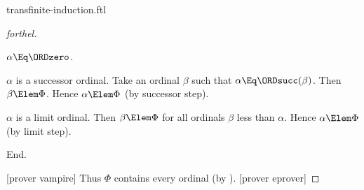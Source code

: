 \documentclass{stex}
\begin{document}
\begin{smodule}{transfinite-induction.ftl}
\begin{proof}[forthel]
    \begin{case}{$\alpha \Eq \ORDzero$.} \end{case}

    \begin{case}{$\alpha$ is a successor ordinal.}
      Take an ordinal $\beta$ such that $\alpha \Eq \ORDsucc(\beta)$.
      Then $\beta \Elem \Phi$.
      Hence $\alpha \Elem \Phi$ (by successor step).
    \end{case}

    \begin{case}{$\alpha$ is a limit ordinal.}
      Then $\beta \Elem \Phi$ for all ordinals $\beta$ less than $\alpha$.
      Hence $\alpha \Elem \Phi$ (by limit step).
    \end{case}
  End.

  [prover vampire]
  Thus $\Phi$ contains every ordinal (by ).
  [prover eprover]
\end{proof}
\end{smodule}
\end{document}

